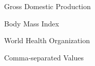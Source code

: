 \documentclass[oneside,12pt]{report}
\begin{document}
 Gross Domestic Production

\vspace{5pt}

 Body Mass Index

\vspace{5pt}

 World Health Organization

\vspace{5pt}

 Comma-separated Values




\renewcommand\bibname{Selected Bibliography Including Cited Works}
\nocite{*}  %

\end{document}

